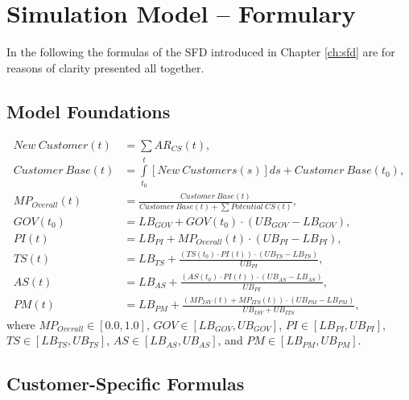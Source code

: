 \chapter{Simulation Model -- Formulary}\label{ch:app04}

In the following the formulas of the \ac{SFD} introduced in Chapter \ref{ch:sfd} are for reasons of clarity presented all together.

\section{Model Foundations}\label{ch:app04:mf}
\begin{align}
	\mathit{New~Customer(t)} &= \sum AR_{CS}(t),\\
	\mathit{Customer~Base(t)} &= \int\limits_{t_0}^t \mathit{[New~Customers(s)]ds} + \mathit{Customer~Base(t_0)},\\
	MP_{Overall}(t) &= \frac{\mathit{Customer~Base(t)}}{\mathit{Customer~Base(t)} + \sum \mathit{Potential~CS(t)}},\\
	GOV(t_0) &= LB_{GOV} + GOV(t_0) \cdot (UB_{GOV} - LB_{GOV}),\\
	PI(t) &= LB_{PI} + MP_{Overall}(t) \cdot (UB_{PI} - LB_{PI}),\\
	TS(t) &= LB_{TS} +  \frac{(TS(t_0) \cdot PI(t)) \cdot (UB_{TS} - LB_{TS})}{UB_{PI}},\\
	AS(t) &= LB_{AS} +  \frac{(AS(t_0)  \cdot PI(t)) \cdot (UB_{AS} - LB_{AS})}{UB_{PI}},\\
	PM(t) &= LB_{PM} + \frac{(MP_{ISV}(t) + MP_{ITS}(t)) \cdot (UB_{PM} - LB_{PM})}{UB_{ISV} + UB_{ITS}},
\end{align}
where $MP_{Overall} \in [0.0,1.0]$, $GOV \in [LB_{GOV},UB_{GOV}]$, $PI \in [LB_{PI},UB_{PI}]$, $TS \in [LB_{TS},UB_{TS}]$, $AS \in [LB_{AS},UB_{AS}]$, and $PM \in [LB_{PM},UB_{PM}]$.
	
\newpage

\section{Customer-Specific Formulas}\label{ch:app04:csf}


